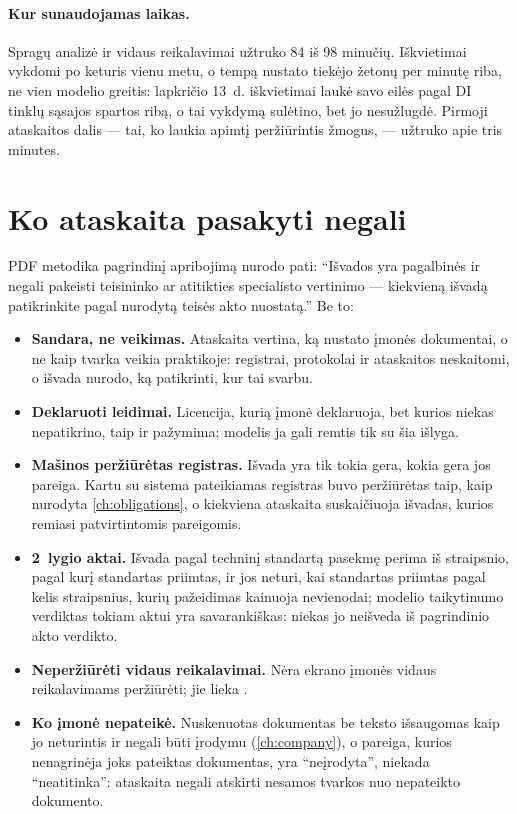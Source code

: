 \paragraph{Kur sunaudojamas laikas.} Spragų analizė ir vidaus reikalavimai užtruko 84 iš 98
minučių. Iškvietimai vykdomi po keturis vienu metu, o tempą nustato tiekėjo žetonų per minutę
riba, ne vien modelio greitis: lapkričio 13~d. iškvietimai laukė savo eilės pagal DI tinklų
sąsajos spartos ribą, o tai vykdymą sulėtino, bet jo nesužlugdė. Pirmoji ataskaitos dalis ---
tai, ko laukia apimtį peržiūrintis žmogus, --- užtruko apie tris minutes.


\section{Ko ataskaita pasakyti negali}\label{sec:report:limits}

PDF metodika pagrindinį apribojimą nurodo pati: \enquote{Išvados yra pagalbinės ir negali
pakeisti teisininko ar atitikties specialisto vertinimo --- kiekvieną išvadą patikrinkite pagal
nurodytą teisės akto nuostatą.} Be to:

\begin{itemize}
  \item \textbf{Sandara, ne veikimas.} Ataskaita vertina, ką nustato įmonės dokumentai, o ne
    kaip tvarka veikia praktikoje: registrai, protokolai ir ataskaitos neskaitomi, o išvada
    nurodo, ką patikrinti, kur tai svarbu.
  \item \textbf{Deklaruoti leidimai.} Licencija, kurią įmonė deklaruoja, bet kurios niekas
    nepatikrino, taip ir pažymima; modelis ja gali remtis tik su šia išlyga.
  \item \textbf{Mašinos peržiūrėtas registras.} Išvada yra tik tokia gera, kokia gera jos
    pareiga. Kartu su sistema pateikiamas registras buvo peržiūrėtas taip, kaip nurodyta
    \cref{ch:obligations}, o kiekviena ataskaita suskaičiuoja išvadas, kurios remiasi
    patvirtintomis pareigomis.
  \item \textbf{2~lygio aktai.} Išvada pagal techninį standartą pasekmę perima iš straipsnio,
    pagal kurį standartas priimtas, ir jos neturi, kai standartas priimtas pagal kelis
    straipsnius, kurių pažeidimas kainuoja nevienodai; modelio
    taikytinumo verdiktas tokiam aktui yra savarankiškas: niekas jo neišveda iš pagrindinio akto
    verdikto.
  \item \textbf{Neperžiūrėti vidaus reikalavimai.} Nėra ekrano įmonės vidaus reikalavimams
    peržiūrėti; jie lieka .
  \item \textbf{Ko įmonė nepateikė.} Nuskenuotas dokumentas be teksto išsaugomas kaip jo
    neturintis ir negali būti įrodymu (\cref{ch:company}), o pareiga, kurios nenagrinėja joks pateiktas dokumentas, yra
    \enquote{neįrodyta}, niekada \enquote{neatitinka}: ataskaita negali atskirti nesamos tvarkos
    nuo nepateikto dokumento.
\end{itemize}
